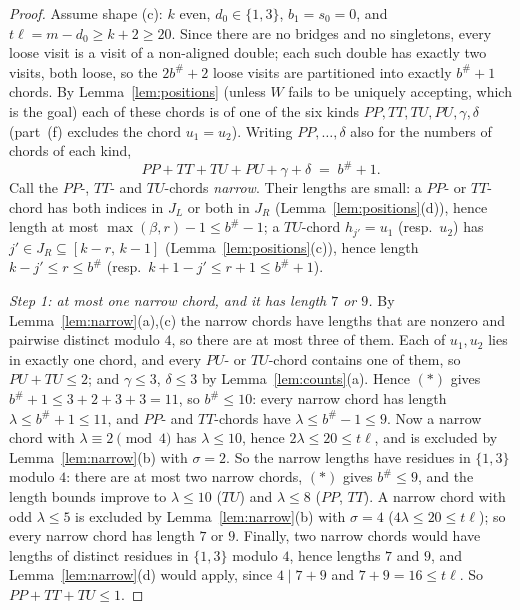 \documentclass[11pt]{article}
\theoremstyle{definition}
\begin{document}
\begin{proof}
Assume shape (c): $k$ even, $d_0\in\{1,3\}$, $b_1=s_0=0$, and
$t\ell=m-d_0\ge k+2\ge20$. Since there are no bridges and no singletons,
every loose visit is a visit of a non-aligned double; each such double has
exactly two visits, both loose, so the $2b^{\#}+2$ loose visits are
partitioned into exactly $b^{\#}+1$ chords. By Lemma~\ref{lem:positions}
(unless $W$ fails to be uniquely accepting, which is the goal) each of
these chords is of one of the six kinds $PP,TT,TU,PU,\gamma,\delta$
(part~(f) excludes the chord $u_1=u_2$). Writing $PP,\dots,\delta$ also for
the numbers of chords of each kind,
\begin{equation}\tag{$*$}
PP+TT+TU+PU+\gamma+\delta\;=\;b^{\#}+1 .
\end{equation}
Call the $PP$-, $TT$- and $TU$-chords \emph{narrow}. Their lengths are
small: a $PP$- or $TT$-chord has both indices in $J_L$ or both in $J_R$
(Lemma~\ref{lem:positions}(d)), hence length at most
$\max(\beta,r)-1\le b^{\#}-1$; a $TU$-chord $h_{j'}=u_1$ (resp.\ $u_2$) has
$j'\in J_R\subseteq[k-r,\,k-1]$ (Lemma~\ref{lem:positions}(c)), hence
length $k-j'\le r\le b^{\#}$ (resp.\ $k+1-j'\le r+1\le b^{\#}+1$).

\emph{Step 1: at most one narrow chord, and it has length $7$ or $9$.}
By Lemma~\ref{lem:narrow}(a),(c) the narrow chords have lengths that are
nonzero and pairwise distinct modulo $4$, so there are at most three of
them. Each of $u_1,u_2$ lies in exactly one chord, and every $PU$- or
$TU$-chord contains one of them, so $PU+TU\le2$; and $\gamma\le3$,
$\delta\le3$ by Lemma~\ref{lem:counts}(a). Hence $(*)$ gives
$b^{\#}+1\le3+2+3+3=11$, so $b^{\#}\le10$: every narrow chord has length
$\lambda\le b^{\#}+1\le11$, and $PP$- and $TT$-chords have
$\lambda\le b^{\#}-1\le9$. Now a narrow chord with
$\lambda\equiv2\pmod4$ has $\lambda\le10$, hence
$2\lambda\le20\le t\ell$, and is excluded by Lemma~\ref{lem:narrow}(b)
with $\sigma=2$. So the narrow lengths have residues in $\{1,3\}$ modulo
$4$: there are at most two narrow chords, $(*)$ gives $b^{\#}\le9$, and the
length bounds improve to $\lambda\le10$ ($TU$) and $\lambda\le8$
($PP$, $TT$). A narrow chord with odd $\lambda\le5$ is excluded by
Lemma~\ref{lem:narrow}(b) with $\sigma=4$ ($4\lambda\le20\le t\ell$); so
every narrow chord has length $7$ or $9$. Finally, two narrow chords would
have lengths of distinct residues in $\{1,3\}$ modulo $4$, hence lengths
$7$ and $9$, and Lemma~\ref{lem:narrow}(d) would apply, since
$4\mid 7+9$ and $7+9=16\le t\ell$. So $PP+TT+TU\le1$.


\end{proof}
\end{document}
